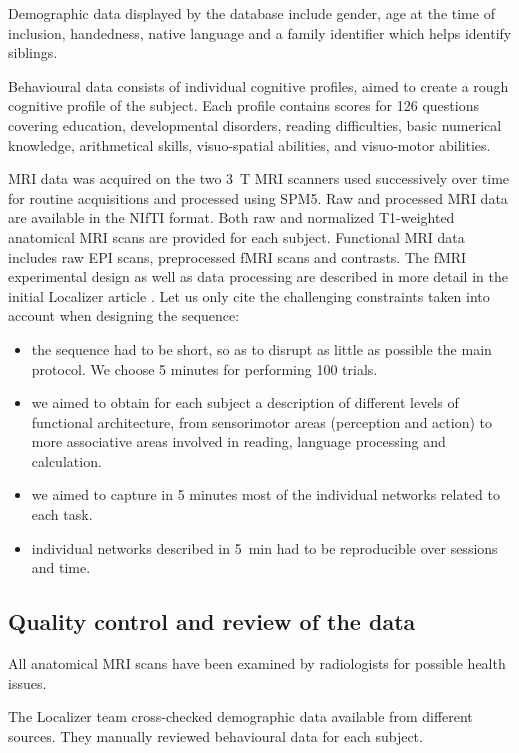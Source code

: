 \documentclass[review]{elsarticle}
\begin{document}
Demographic data displayed by the database include gender, age at the time
of inclusion, handedness, native language and a family identifier which helps
identify siblings.

Behavioural data consists of individual cognitive profiles, aimed to create
a rough cognitive profile of the subject. Each profile contains scores for 126
questions covering education, developmental disorders, reading difficulties,
basic numerical knowledge, arithmetical skills, visuo-spatial abilities, and
visuo-motor abilities.

MRI data was acquired on the two 3~T MRI scanners used successively over
time for routine acquisitions and processed using SPM5. Raw and processed
MRI data are available in the NIfTI format. Both raw and normalized T1-weighted
anatomical MRI scans are provided for each subject. Functional MRI data includes
raw EPI scans, preprocessed fMRI scans and contrasts. The fMRI experimental design
as well as data processing are described in more detail in the initial Localizer
article \cite{Pinel2007}. Let us only cite the challenging constraints taken
into account when designing the sequence:
\begin{itemize}
\item the sequence had to be short, so as to disrupt as little as possible the main protocol. We choose 5 minutes for performing 100 trials.
\item we aimed to obtain for each subject a description of different levels of functional architecture, from sensorimotor areas (perception and action) to more associative areas involved in reading, language processing and calculation.
\item we aimed to capture in 5 minutes most of the individual networks related to each task.
\item individual networks described in 5~min had to be reproducible over sessions and time.
\end{itemize}


\subsection{Quality control and review of the data}

All anatomical MRI scans have been examined by radiologists for possible health issues.

The Localizer team cross-checked demographic data available from different
sources. They manually reviewed behavioural data for each subject.
\end{document}

